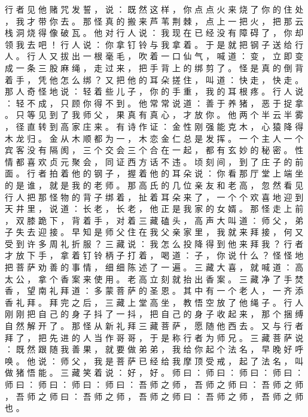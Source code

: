 {行 者 见 他 赌 咒 发 誓 ， 说 ： 既 然 这 样 ， 你 点 点 火 来 烧 了 你 的 住 处 ， 我 才 带 你 去 。
那 怪 真 的 搬 来 芦 苇 荆 棘 ， 点 上 一 把 火 ， 把 那 云 栈 洞 烧 得 像 破 瓦 。
他 对 行 人 说 ： 我 现 在 已 经 没 有 障 碍 了 ， 你 却 领 我 去 吧 ！
行 人 说 ： 你 拿 钉 铃 与 我 拿 着 。
于 是 就 把 钢 子 送 给 行 人 。
行 人 又 拔 出 一 根 毫 毛 ， 吹 着 一 口 仙 气 ， 喊 道 ： 变 ， 立 即 变 成 一 条 三 股 麻 绳 ， 走 过 来 ， 把 手 背 上 的 绑 剪 了 。
怪 是 真 的 倒 背 着 手 ， 凭 他 怎 么 绑 ？
又 把 他 的 耳 朵 搓 住 ， 叫 道 ： 快 走 ， 快 走 。
那 人 奇 怪 地 说 ： 轻 着 些 儿 子 ， 你 的 手 重 ， 我 的 耳 根 疼 。
行 人 说 ： 轻 不 成 ， 只 顾 你 得 不 到 。
他 常 常 说 道 ： 善 于 养 猪 ， 恶 于 捉 拿 。
只 等 见 到 了 我 师 父 ， 果 真 有 真 心 ， 才 放 你 。
他 两 个 半 云 半 雾 ， 径 直 转 到 高 家 庄 来 。
有 诗 作 证 ： 金 性 刚 强 能 克 木 ， 心 猿 降 得 木 龙 归 。
金 从 木 顺 都 为 一 ， 木 恋 金 仁 总 是 发 挥 。
一 个 主 人 一 个 宾 客 没 有 隔 阂 ， 三 个 交 会 三 个 合 在 一 起 ， 都 有 玄 妙 的 秘 密 。
性 情 都 喜 欢 贞 元 聚 会 ， 同 证 西 方 话 不 违 。
顷 刻 间 ， 到 了 庄 子 的 前 面 。
行 者 拍 着 他 的 钢 子 ， 握 着 他 的 耳 朵 说 ： 你 看 那 厅 堂 上 端 坐 的 是 谁 ， 就 是 我 的 老 师 。
那 高 氏 的 几 位 亲 友 和 老 高 ， 忽 然 看 见 行 人 把 那 怪 物 的 背 子 绑 着 ， 扯 着 耳 朵 来 了 ， 一 个 个 欢 喜 地 迎 到 天 井 里 ， 说 道 ： 长 老 ， 长 老 ， 他 正 是 我 家 的 女 婿 。
那 怪 走 上 前 ， 双 膝 跪 下 ， 背 着 手 ， 对 着 三 藏 磕 头 ， 高 声 大 叫 道 ： 师 父 ， 弟 子 失 去 迎 接 。
早 知 是 师 父 住 在 我 父 亲 家 里 ， 我 就 来 拜 接 ， 何 又 受 到 许 多 周 礼 折 服 ？ 三 藏 说 ： 我 怎 么 投 降 得 到 他 来 拜 我 ？ 行 者 才 放 下 手 ， 拿 着 钉 铃 柄 子 打 着 ， 喝 道 ： 子 ， 你 说 什 么 ？
怪 怪 地 把 菩 萨 劝 善 的 事 情 ， 细 细 陈 述 了 一 遍 。
三 藏 大 喜 ， 就 喊 道 ： 高 太 公 ， 拿 个 香 案 来 使 用 。
老 高 立 刻 就 抬 出 香 案 。
三 藏 净 了 手 焚 香 ， 望 南 礼 拜 道 ： 多 蒙 菩 萨 的 圣 恩 。
其 中 有 一 个 老 人 ， 一 齐 添 香 礼 拜 。
拜 完 之 后 ， 三 藏 上 堂 高 坐 ， 教 悟 空 放 了 他 绳 子 。
行 人 刚 刚 把 自 己 的 身 子 抖 了 一 抖 ， 把 自 己 的 身 子 收 起 来 ， 那 个 捆 缚 自 然 解 开 了 。
那 怪 从 新 礼 拜 三 藏 菩 萨 ， 愿 随 他 西 去 。
又 与 行 者 拜 了 ， 把 先 进 的 人 当 作 哥 哥 ， 于 是 称 行 者 为 师 兄 。
三 藏 菩 萨 说 ： 既 然 跟 随 我 善 果 ， 就 要 做 弟 弟 ， 我 给 你 起 个 法 名 ， 早 晚 好 呼 唤 。
他 说 ： 师 父 ， 我 是 菩 萨 已 经 给 我 摩 顶 受 戒 ， 起 了 法 名 ， 叫 做 猪 悟 能 。
三 藏 笑 着 说 ： 好 ， 好 。
师 曰 ： 师 曰 ： 师 曰 ： 师 曰 ： 师 曰 ： 师 曰 ： 师 曰 ： 师 曰 ： 吾 师 之 师 ， 吾 师 之 师 曰 ： 吾 师 之 师 ， 吾 师 之 师 曰 ： 吾 师 之 师 ， 吾 师 之 师 曰 ： 吾 师 之 师 ， 吾 师 之 师 也 。
}
